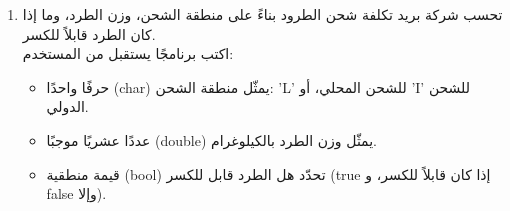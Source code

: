 \documentclass[14pt]{extarticle}
\begin{document}
\begin{enumerate}[resume, itemsep=2.2em]
\ifdetailed
\begin{boxExample}[1]
\begin{english}
\begin{verbatim}
Enter scheduled arrival (HHMM):
1350
Enter actual arrival (HHMM):
1406
Delay in minutes: 16
Compensation: 18
\end{verbatim}
\end{english}
\end{boxExample}
لأنّ الوقت المجدول هو $13 \times 60 + 50 = 830$ دقيقة، والوقت الفعلي هو $14 \times 60 + 6 = 846$ دقيقة. التأخير هو $846 - 830 = 16$ دقيقة، والتعويض هو $\sqrt{16} \times 4.5 = 4 \times 4.5 = 18$.
\fi

\ifwithsols
\begin{boxSolution}
\begin{english}
\begin{verbatim}
Console.WriteLine("Enter scheduled arrival (HHMM):");
int scheduled = int.Parse(Console.ReadLine());
Console.WriteLine("Enter actual arrival (HHMM):");
int actual = int.Parse(Console.ReadLine());

int schedMins = (scheduled / 100) * 60 + (scheduled % 100);
int actualMins = (actual / 100) * 60 + (actual % 100);

if (actualMins <= schedMins)
{
    if (schedMins - actualMins > 10)
    {
        Console.WriteLine("Too Early");
    }
    else
    {
        Console.WriteLine("On Time");
    }
}
else
{
    int delay = actualMins - schedMins;
    Console.WriteLine("Delay in minutes: " + delay);
    double comp = Math.Round(Math.Sqrt(delay) * 4.5);
    Console.WriteLine("Compensation: " + comp);
}
\end{verbatim}
\end{english}
\end{boxSolution}
\fi
\filbreak

\item
تحسب شركة بريد تكلفة شحن الطرود بناءً على منطقة الشحن، وزن الطرد، وما إذا كان الطرد قابلاً للكسر. \\
اكتب برنامجًا يستقبل من المستخدم:
\begin{itemize}[nosep]
    \item حرفًا واحدًا (\textenglish{char}) يمثّل منطقة الشحن: \textenglish{'L'} للشحن المحلي، أو \textenglish{'I'} للشحن الدولي.
    \item عددًا عشريًا موجبًا (\textenglish{double}) يمثّل وزن الطرد بالكيلوغرام.
    \item قيمة منطقية (\textenglish{bool}) تحدّد هل الطرد قابل للكسر (\textenglish{true} إذا كان قابلاً للكسر، و \textenglish{false} وإلا).
\end{itemize}


\end{enumerate}
\end{document}
